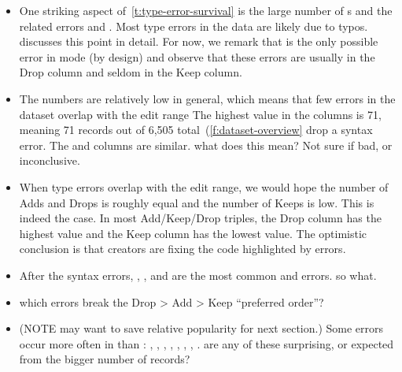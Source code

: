 \documentclass[english,submission,cleveref]{programming}
\begin{document}
\begin{itemize}
  \item
    One striking aspect of~\cref{t:type-error-survival} is the large number
    of s and the related errors  and
    .
    Most type errors in the data are likely due to typos.
     discusses this point in detail.
    For now, we remark that  is the only possible error
    in \mnocheck{} mode (by design) and observe that these errors are
    usually in the Drop column and seldom in the Keep column.

  \item
    The numbers are relatively low in general, which means that
    few errors in the dataset overlap with the edit range
    The highest value in the \mstrict{} columns is 71, meaning 71 records
    out of 6,505 total~(\cref{f:dataset-overview} drop a syntax error.
    The \mnonstrict{} and \mnocheck{} columns are similar.
    \FILL{} what does this mean? Not sure if bad, or inconclusive.

  \item
    When type errors overlap with the edit range,
    we would hope the number of Adds and Drops is roughly
    equal and the number of Keeps is low.
    This is indeed the case.
    In most Add/Keep/Drop triples, the Drop column has the highest
    value and the Keep column has the lowest value.
    The optimistic conclusion is that creators are fixing the code
    highlighted by errors.


  \item
    After the syntax errors, ,
    , and  are the most common
    \mnonstrict{} and \mstrict{} errors.
    \FILL{} so what.

  \item
    \FILL{} which errors break the Drop > Add > Keep ``preferred order''?

  \item
    (NOTE may want to save relative popularity for next section.)
    Some errors occur more often in \mnonstrict{} than \mstrict{}:
    ,
    ,
    ,
    ,
    ,
    ,
    ,
    .
    \QALAN{} are any of these surprising, or expected from the bigger number of
    \mnonstrict{} records?


\end{itemize}
\end{document}

